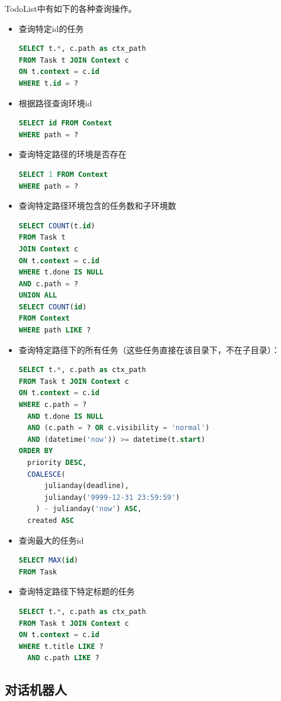 \documentclass[logo,reportComp]{thesis}
\begin{document}
TodoList中有如下的各种查询操作。
\begin{itemize}
\item 查询特定id的任务
\begin{lstlisting}[language=SQL]
SELECT t.*, c.path as ctx_path
FROM Task t JOIN Context c
ON t.context = c.id
WHERE t.id = ?
\end{lstlisting}
\item 根据路径查询环境id
\begin{lstlisting}[language=SQL]
SELECT id FROM Context
WHERE path = ?
\end{lstlisting}
\item 查询特定路径的环境是否存在
\begin{lstlisting}[language=SQL]
SELECT 1 FROM Context
WHERE path = ?
\end{lstlisting}
\item 查询特定路径环境包含的任务数和子环境数
\begin{lstlisting}[language=SQL]
SELECT COUNT(t.id)
FROM Task t
JOIN Context c
ON t.context = c.id
WHERE t.done IS NULL
AND c.path = ?
UNION ALL
SELECT COUNT(id)
FROM Context
WHERE path LIKE ?
\end{lstlisting}
\item 查询特定路径下的所有任务（这些任务直接在该目录下，不在子目录）：
\begin{lstlisting}[language=SQL]
SELECT t.*, c.path as ctx_path
FROM Task t JOIN Context c
ON t.context = c.id
WHERE c.path = ?
  AND t.done IS NULL
  AND (c.path = ? OR c.visibility = 'normal')
  AND (datetime('now')) >= datetime(t.start)
ORDER BY
  priority DESC,
  COALESCE(
      julianday(deadline),
      julianday('9999-12-31 23:59:59')
    ) - julianday('now') ASC,
  created ASC
\end{lstlisting}
\item 查询最大的任务id
\begin{lstlisting}[language=SQL]
SELECT MAX(id)
FROM Task
\end{lstlisting}
\item 查询特定路径下特定标题的任务
\begin{lstlisting}[language=SQL]
SELECT t.*, c.path as ctx_path
FROM Task t JOIN Context c
ON t.context = c.id
WHERE t.title LIKE ?
  AND c.path LIKE ?
\end{lstlisting}
\end{itemize}

\subsection{对话机器人} %
\end{document}

